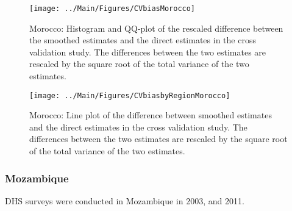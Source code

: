 \documentclass[12pt]{article}\usepackage[]{graphicx}\usepackage[]{color}
\newenvironment{knitrout}{}{} %
\begin{document}
\begin{knitrout}
\color{fgcolor}\begin{figure}[bht]

{\centering \texttt{[image: ../Main/Figures/CVbiasMorocco]} 

}

\caption[Morocco]{Morocco: Histogram and QQ-plot of the rescaled difference between the smoothed estimates and the direct estimates in the cross validation study. The differences between the two estimates are rescaled by the square root of the total variance of the two estimates.}\label{fig:unnamed-chunk-229}
\end{figure}


\end{knitrout}

\begin{knitrout}
\color{fgcolor}\begin{figure}[bht]

{\centering \texttt{[image: ../Main/Figures/CVbiasbyRegionMorocco]} 

}

\caption[Morocco]{Morocco: Line plot of the difference between smoothed estimates and the direct estimates in the cross validation study. The differences between the two estimates are rescaled by the square root of the total variance of the two estimates.}\label{fig:unnamed-chunk-230}
\end{figure}


\end{knitrout}


\clearpage
\subsubsection{Mozambique}





DHS surveys were conducted in Mozambique in 2003, and 2011.
\end{document}
